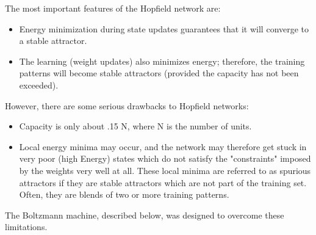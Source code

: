 The most important features of the Hopfield network are:
\begin{itemize}
\item Energy minimization during state updates guarantees that it will converge to a stable attractor.
\item The learning (weight updates) also minimizes energy; therefore, the training patterns will become stable attractors (provided the capacity has not been exceeded).
\end{itemize}

However, there are some serious drawbacks to Hopfield networks:
\begin{itemize}
\item Capacity is only about .15 N, where N is the number of units.
\item Local energy minima may occur, and the network may therefore get stuck in very poor (high Energy) states which do not satisfy the "constraints" imposed by the weights very well at all. These local minima are referred to as spurious attractors if they are stable attractors which are not part of the training set. Often, they are blends of two or more training patterns.
\end{itemize}

The Boltzmann machine, described below, was designed to overcome these limitations.


